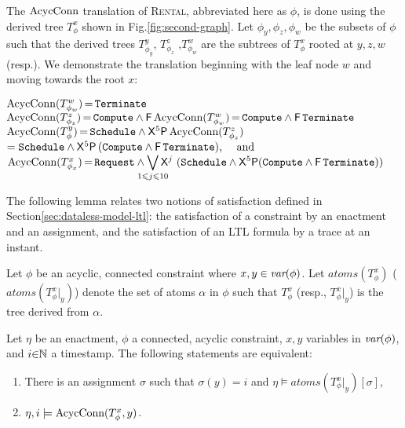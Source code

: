   \begin{examp}
    The $\text{AcycConn}$ translation of \textsc{Rental},
    abbreviated here as $\phi$,
    is done using the derived tree $T_\phi^x$
    shown in Fig.\:\ref{fig:second-graph}.
    Let $\phi_y,\phi_z,\phi_w$ be the subsets of $\phi$
    such that the derived trees $T_{\phi_y}^y$,
    $T_{\phi_z}^z$ ,$T_{\phi_w}^w$
    are the subtrees of $T_\phi^x$
    rooted at $y,z,w$ (resp.).
    We demonstrate the translation beginning with the leaf node $w$
    and moving towards the root $x$:
  
    \noindent
    $\text{AcycConn}(T_{\phi_w}^w)\,{=}\,\texttt{Terminate}$\\
    $\text{AcycConn}(T_{\phi_z}^z)
    \,{=}\, \mbox{{\tt Compute}}\land{\sf F}\,\text{AcycConn}(T_{\phi_w}^w)
    \,{=}\, \mbox{{\tt Compute}}\land{\sf F}\,\texttt{Terminate}$\\
    $\text{AcycConn}(T_{\phi}^y) \,{=}\, \texttt{Schedule} \land {\sf X}^5{\sf P}\,\text{AcycConn}(T_{\phi_z}^z)$\\
      \hspace*{6.25em}$= \texttt{Schedule} \land
        {\sf X}^5{\sf P}\,(\mbox{{\tt Compute}}\land{\sf F}\,\texttt{Terminate})\mbox{, ~~~and}$\\
      $\AcycConn(T_{\phi_{x}}^x) \tight=\displaystyle
      \Request\land \hspace*{-3mm}\bigvee_{1\leq j \leq 10}\hspace*{-3mm}{\sf X}^j\ 
      (\Schedule \land {\sf X}^5{\sf P}(\Compute\land{\sf F}\,\Terminate))$
  \end{examp}
  
  The following lemma relates two notions of satisfaction
  defined in Section\:\ref{sec:dataless-model-ltl}:
  the satisfaction of a constraint by an enactment and an assignment,
  and the satisfaction of an LTL formula by a trace at an instant.
  
  Let $\phi$ be an acyclic, connected constraint
  where $x,y\in\textit{var}(\phi)$.
  Let $atoms(T_\phi^x)$ ($atoms(T_\phi^x|_y)$)
  denote the set of atoms $\alpha$ in $\phi$
  such that $T_\phi^x$ (resp., $T_\phi^x|_y$) is the tree derived from $\alpha$.
  
\begin{lemma}\label{lem:connected-constraint-translation}
  Let $\eta$ be an enactment,
  $\phi$ a connected, acyclic constraint,
  $x,y$ variables in $\textit{var}(\phi)$, and
  $i{\in}\mathbb{N}$ a timestamp.
  The following statements are equivalent:
  \begin{enumerate}
  \item
    There is an assignment $\sigma$ such that
    $\sigma(y)=i$ and
    $\eta\models atoms(T_\phi^x|_y)[\sigma]$,
  \item
    $\eta, i\models \text{AcycConn}(T_\phi^x,y)$.
  \end{enumerate}
\end{lemma}
  
